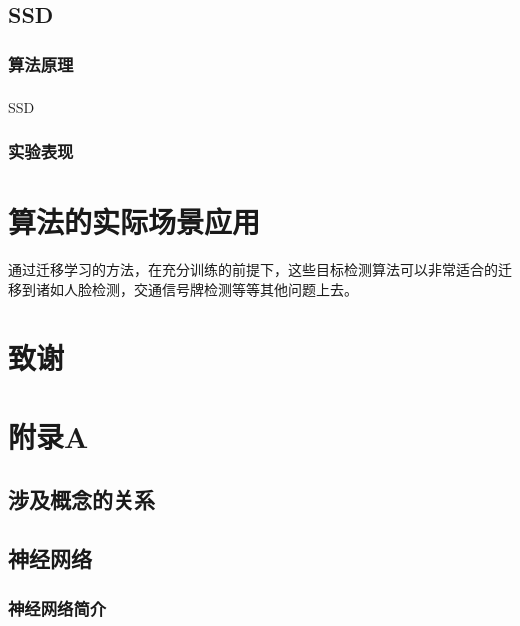 \documentclass[12pt,a4paper,titlepage]{article}
\newcommand{\upcite}[1]{\textsuperscript{\textsuperscript{\cite{#1}}}}  %
\begin{document}
\subsection{SSD}
\subsubsection{算法原理}
SSD\upcite{liu2016ssd}
\subsubsection{实验表现}


\section{算法的实际场景应用}
通过迁移学习的方法，在充分训练的前提下，这些目标检测算法可以非常适合的迁移到诸如人脸检测，交通信号牌检测等等其他问题上去。

\section*{致谢}


\newpage
\renewcommand\refname{\zihao{-2} 参考文献}


\newpage
\section*{附录A}

\subsection*{涉及概念的关系}


\subsection*{神经网络}
\subsubsection*{神经网络简介}
\end{document}
